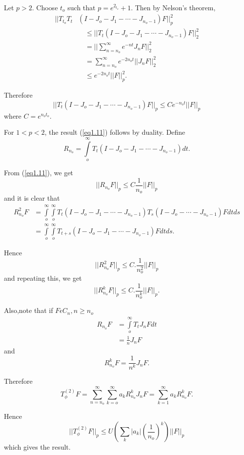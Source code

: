   Let $p > 2$. Choose $t_o$ such that $p = e^{2_{t_o}} + 1$. Then by
  Nelson's theorem, 
  \begin{align*} 
    || T_{t_o} T_t & (I - J_o - J_1 - \cdots - J_{n_o -1}) F ||^2_p\\
    & \quad \le   ||T_t (I - J_o - J_1 - \cdots - J_{n_o -1}) F ||^2_2\\
    & \quad =   || \sum_{n = n_o}^{\infty} e^{-nt} J_n F ||^2_2\\
    & \quad =  \sum_{n = n_o}^{\infty} e^{-2n_o t} || J_n F ||^2_2\\
    & \quad \le  e^{-2n_o t} || F ||_p^2.
  \end{align*}\pageoriginale

Therefore
$$
|| T_t (I - J_o - J_1 - \cdots - J_{n_o -1})F ||_p \le C e^{-n_o t} || F ||_p
$$
where $C = e^{n_o t_o}$.

For $1 < p < 2$, the result (\ref{eq1.11}) follows by duality. Define
$$
R_{n_o} = \int\limits_o^\infty T_t(I - J_o - J_1 - \cdots - J_{n_o -1}) dt.
$$

From (\ref{eq1.11}), we get 
$$
|| R_{n_o} F ||_p \le C \frac{1}{n_o} || F ||_p
$$
and it is clear that  
{\fontsize{10pt}{12pt}\selectfont
\begin{align*}
  R_{n_o}^2 F & =\int\limits_o^\infty \int\limits_{o}^\infty T_t (I -
  J_o - J_1 - \cdots - J_{n_o -1}) T_s (I - J_o - \cdots - J_{n_o -1})
  Fdtds\\ 
  & =\int\limits_o^\infty \int\limits_{o}^{\infty} T_{t + s} (I - J_o -
  J_1 - \cdots - J_{n_o -1}) F dtds. 
\end{align*}}\relax

Hence
$$
|| R^2_{n_o} F ||_p \le C. \frac{1}{n^2_o} || F ||_p
$$
and repeating this, we get
$$
|| R^k_{n_o} F ||_p \le C. \frac{1}{n^k_o} || F ||_p.
$$

Also,\pageoriginale note that if $F \epsilon  C_n, n \ge n_o$
\begin{align*}
  R_{n_o} F & = \int\limits_{o}^{\infty} T_t J_n F dt\\
           & = \frac {1}{n} J_n F
\end{align*}
and
$$
R^k_{n_o} F = \frac{1}{n^k} J_n F.
$$

Therefore
$$
T_\phi^{(2)} F = \sum_{n = n_o}^{\infty} \sum_{k = o}^{\infty} a_k
R_{n_o}^{k} J_n F = \sum_{k = 1}^{\infty} a_k R_{n_o}^k F. 
$$

Hence
$$
|| T_\phi^{(2)} F ||_p \le U \left(\sum_k | a_k |
\left(\frac{1}{n_o}\right)^k\right) || F ||_p 
$$
which gives the result.

